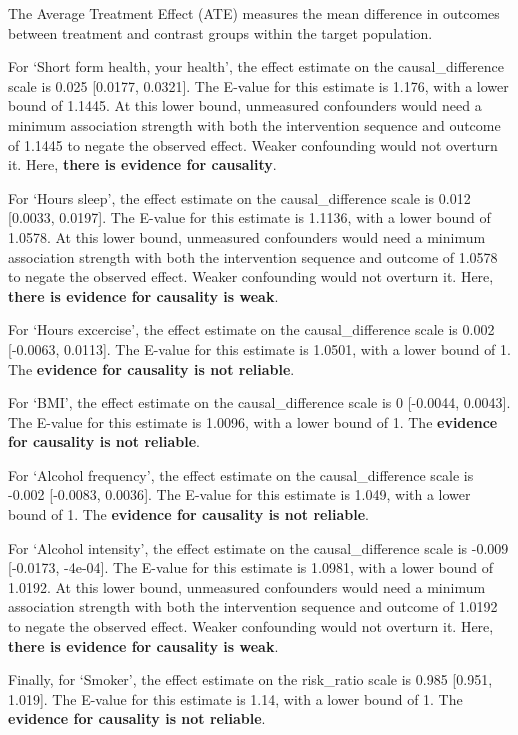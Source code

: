 \documentclass[
  single column]{article}
\begin{document}
The Average Treatment Effect (ATE) measures the mean difference in
outcomes between treatment and contrast groups within the target
population.

For `Short form health, your health', the effect estimate on the
causal\_difference scale is 0.025 {[}0.0177, 0.0321{]}. The E-value for
this estimate is 1.176, with a lower bound of 1.1445. At this lower
bound, unmeasured confounders would need a minimum association strength
with both the intervention sequence and outcome of 1.1445 to negate the
observed effect. Weaker confounding would not overturn it. Here,
\textbf{there is evidence for causality}.

For `Hours sleep', the effect estimate on the causal\_difference scale
is 0.012 {[}0.0033, 0.0197{]}. The E-value for this estimate is 1.1136,
with a lower bound of 1.0578. At this lower bound, unmeasured
confounders would need a minimum association strength with both the
intervention sequence and outcome of 1.0578 to negate the observed
effect. Weaker confounding would not overturn it. Here, \textbf{there is
evidence for causality is weak}.

For `Hours excercise', the effect estimate on the causal\_difference
scale is 0.002 {[}-0.0063, 0.0113{]}. The E-value for this estimate is
1.0501, with a lower bound of 1. The \textbf{evidence for causality is
not reliable}.

For `BMI', the effect estimate on the causal\_difference scale is 0
{[}-0.0044, 0.0043{]}. The E-value for this estimate is 1.0096, with a
lower bound of 1. The \textbf{evidence for causality is not reliable}.

For `Alcohol frequency', the effect estimate on the causal\_difference
scale is -0.002 {[}-0.0083, 0.0036{]}. The E-value for this estimate is
1.049, with a lower bound of 1. The \textbf{evidence for causality is
not reliable}.

For `Alcohol intensity', the effect estimate on the causal\_difference
scale is -0.009 {[}-0.0173, -4e-04{]}. The E-value for this estimate is
1.0981, with a lower bound of 1.0192. At this lower bound, unmeasured
confounders would need a minimum association strength with both the
intervention sequence and outcome of 1.0192 to negate the observed
effect. Weaker confounding would not overturn it. Here, \textbf{there is
evidence for causality is weak}.

Finally, for `Smoker', the effect estimate on the risk\_ratio scale is
0.985 {[}0.951, 1.019{]}. The E-value for this estimate is 1.14, with a
lower bound of 1. The \textbf{evidence for causality is not reliable}.
\end{document}
